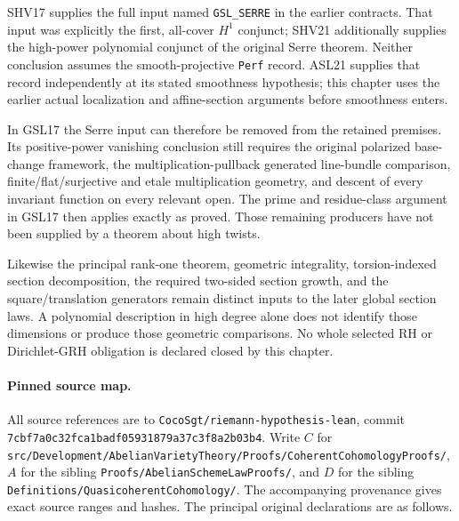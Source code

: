 SHV17 supplies the full input named \texttt{GSL\_SERRE} in
the earlier contracts.  That input was explicitly the first,
all-cover $H^1$ conjunct; SHV21 additionally supplies the
high-power polynomial conjunct of the original Serre theorem.
Neither conclusion assumes the smooth-projective \texttt{Perf}
record.  ASL21 supplies that record independently at its stated
smoothness hypothesis; this chapter uses the earlier actual
localization and affine-section arguments before smoothness enters.

In GSL17 the Serre input can therefore be removed from the retained
premises.  Its positive-power vanishing conclusion still requires the
original polarized base-change framework, the multiplication-pullback
generated line-bundle comparison, finite/flat/surjective and etale
multiplication geometry, and descent of every invariant function on
every relevant open.  The prime and residue-class argument in GSL17
then applies exactly as proved.  Those remaining producers have not
been supplied by a theorem about high twists.

Likewise the principal rank-one theorem, geometric integrality,
torsion-indexed section decomposition, the required two-sided section
growth, and the square/translation generators remain distinct inputs
to the later global section laws.  A polynomial description in high
degree alone does not identify those dimensions or produce those
geometric comparisons.  No whole selected RH or Dirichlet-GRH
obligation is declared closed by this chapter.

\paragraph{Pinned source map.}
All source references are to
\texttt{Coco\allowbreak{}Sgt/\allowbreak{}riemann-hypothesis-lean}, commit
\texttt{7cbf7a0c32fca1badf05931879a37c3f8a2b03b4}.
Write $C$ for
\texttt{src/\allowbreak{}Development/\allowbreak{}Abelian\allowbreak{}Variety\allowbreak{}Theory/\allowbreak{}Proofs/\allowbreak{}Coherent\allowbreak{}Cohomology\allowbreak{}Proofs/\allowbreak{}},
$A$ for the sibling
\texttt{Proofs/\allowbreak{}Abelian\allowbreak{}Scheme\allowbreak{}Law\allowbreak{}Proofs/\allowbreak{}}, and $D$ for the sibling
\texttt{Definitions/\allowbreak{}Quasicoherent\allowbreak{}Cohomology/\allowbreak{}}.
The accompanying provenance gives exact source ranges and hashes.
The principal original declarations are as follows.

